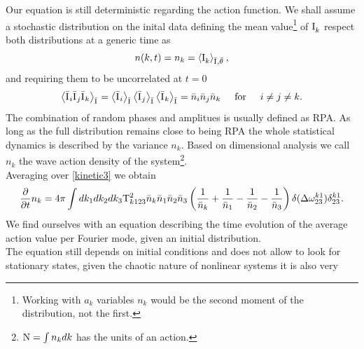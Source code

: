 Our equation is still deterministic regarding the action function. We shall assume a stochastic distribution on the inital data defining 
the mean value\footnote{Working with $a_k$ variables $n_k$ would be the second moment of the distribution, not the first.}
of $\mathrm{I}^{}_k$ respect both distributions at a generic time as 
\begin{equation}
    n(k,t) = n_k = \left\langle \mathrm{I}^{}_k \right\rangle_{\bar{\mathrm{I}^{}}, \bar{\theta}^{}},
    \label{wavdef}
\end{equation}     
and requiring them to be uncorrelated at $t=0$ \\
\begin{equation}
    \left\langle \bar{\mathrm{I}^{}}_i \bar{\mathrm{I}^{}}_j \bar{\mathrm{I}^{}}_k\right\rangle_{\bar{\mathrm{I}^{}}} = 
    \left\langle\bar{\mathrm{I}^{}}_i \right\rangle_{\bar{\mathrm{I}^{}}} \left\langle \bar{\mathrm{I}^{}}_j \right\rangle_{\bar{\mathrm{I}^{}}} \left\langle \bar{\mathrm{I}^{}}_k \right\rangle_{\bar{\mathrm{I}^{}}}
    = \bar{n}_i \bar{n}_j \bar{n}_k \hspace{5mm} \text{for} \hspace{5mm} i\neq j\neq k.
\end{equation}
The combination of random phases and amplitues is usually defined as RPA. As long as the full distribution remains close to being RPA the whole statistical dynamics
is described by the variance $n_k$. Based on dimensional analysis we call 
$n_k$ the wave action density of the system\footnote{$\mathrm{N} = \int n_k dk$ has the units of an action.}.\\
Averaging over \eqref{kinetic3} we obtain
\begin{equation}
    \frac{\partial}{\partial t} n_k = 4 \pi\int dk_1 dk_2 dk_3 \\
    \mathrm{T}^2_{k123}\bar{n}_k\bar{n}_1\bar{n}_2\bar{n}_3
    \left(\frac{1}{\bar{n}_k} + \frac{1}{\bar{n}_1} - \frac{1}{\bar{n}_2}- \frac{1}{\bar{n}_3}  \right)
    \delta(\Delta{\omega}^{k1}_{23})\delta^{k1}_{23}.
    \label{kinetic4}
\end{equation}
We find ourselves with an equation describing the time evolution of the average action value per Fourier mode, given an initial distribution.\\
The equation still depends on initial conditions and does not allow to look for stationary states, given the chaotic nature of nonlinear systems it is also very 
